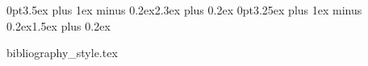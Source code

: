 \titlespacing*{\section}      {0pt}{3.5ex  plus 1ex minus 0.2ex}{2.3ex plus 0.2ex}
\titlespacing*{\subsection}   {0pt}{3.25ex plus 1ex minus 0.2ex}{1.5ex plus 0.2ex}

\newcommand*{\appxchaptosect}{\addtocontents{toc}{\let\protect\l@chapter\protect\l@section}}

\newcommand*{\chapterintrobox}[1]{%
\begin{tcolorbox}[colback=ThesisLghtGrey,colframe=ThesisLghtGrey,sharp corners]
  \textit{#1}
\end{tcolorbox}}

\renewcommand*{\mkbegdispquote}[2]{\openautoquote} %
\renewcommand*{\mkenddispquote}[2]{\closeautoquote#1#2}

{bibliography_style.tex}

\hypersetup{colorlinks} %

\newcommand*{\frontchapter}[2]{%
\chapter*{#1}
\hypertarget{#2}{}
\bookmark[level=chapter,dest=#2]{#1}}

\newcommand*{\thesistoc}{%
\clearpage{}
\pdfbookmark{\contentsname}{toc}
\tableofcontents}


